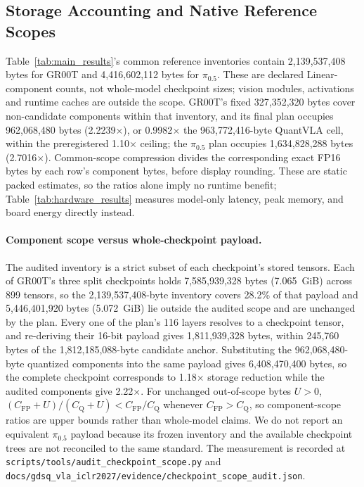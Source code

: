 

\subsection{Storage Accounting and Native Reference Scopes}
\label{sec:storage_scope}

Table~\ref{tab:main_results}'s common reference inventories contain 2,139,537,408 bytes for GR00T and 4,416,602,112 bytes for $\pi_{0.5}$. These are declared Linear-component counts, not whole-model checkpoint sizes; vision modules, activations and runtime caches are outside the scope. GR00T's fixed 327,352,320 bytes cover non-candidate components within that inventory, and its final plan occupies 962,068,480 bytes (2.2239$\times$), or 0.9982$\times$ the 963,772,416-byte QuantVLA cell, within the preregistered 1.10$\times$ ceiling; the $\pi_{0.5}$ plan occupies 1,634,828,288 bytes (2.7016$\times$). Common-scope compression divides the corresponding exact FP16 bytes by each row's component bytes, before display rounding. These are static packed estimates, so the ratios alone imply no runtime benefit; Table~\ref{tab:hardware_results} measures model-only latency, peak memory, and board energy directly instead.

\paragraph{Component scope versus whole-checkpoint payload.}
The audited inventory is a strict subset of each checkpoint's stored tensors. Each of GR00T's three split checkpoints holds 7,585,939,328 bytes (7.065~GiB) across 899 tensors, so the 2,139,537,408-byte inventory covers 28.2\% of that payload and 5,446,401,920 bytes (5.072~GiB) lie outside the audited scope and are unchanged by the plan. Every one of the plan's 116 layers resolves to a checkpoint tensor, and re-deriving their 16-bit payload gives 1,811,939,328 bytes, within 245,760 bytes of the 1,812,185,088-byte candidate anchor. Substituting the 962,068,480-byte quantized components into the same payload gives 6,408,470,400 bytes, so the complete checkpoint corresponds to 1.18$\times$ storage reduction while the audited components give 2.22$\times$. For unchanged out-of-scope bytes $U>0$, $(C_{\mathrm{FP}}+U)/(C_{\mathrm{Q}}+U)<C_{\mathrm{FP}}/C_{\mathrm{Q}}$ whenever $C_{\mathrm{FP}}>C_{\mathrm{Q}}$, so component-scope ratios are upper bounds rather than whole-model claims. We do not report an equivalent $\pi_{0.5}$ payload because its frozen inventory and the available checkpoint trees are not reconciled to the same standard. The measurement is recorded at \nolinkurl{scripts/tools/audit_checkpoint_scope.py} and \nolinkurl{docs/gdsq_vla_iclr2027/evidence/checkpoint_scope_audit.json}.

